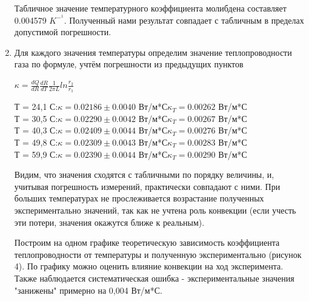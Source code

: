 \documentclass{article}
\begin{document}
\begin{enumerate}
    Табличное значение температурного коэффициента молибдена составляет 0.004579 $K^-^1$. Полученный нами результат совпадает с табличным в пределах допустимой погрешности.
    
    \item Для каждого значения температуры определим значение теплопроводности газа по формуле, учтём погрешности из предыдущих пунктов
    \begin{center}
    $\kappa = \frac{dQ}{dR} \frac{dR}{dT} \frac{1}{2 \pi L} ln\frac{r_2}{r_1}$
    \end{center}
    
    \begin{center}
     Т = 24,1 С:\hspace{0.5cm}$\kappa = 0.02186 \pm 0.0040$ Вт/м*С\hspace{0.5cm}$\kappa_T = 0.00262$ Вт/м*С\\
     Т = 30,5 С:\hspace{0.5cm}$\kappa = 0.02290 \pm 0.0042$ Вт/м*С\hspace{0.5cm}$\kappa_T = 0.00267$ Вт/м*С\\
     Т = 40,3 С:\hspace{0.5cm}$\kappa = 0.02409 \pm 0.0044$ Вт/м*С\hspace{0.5cm}$\kappa_T = 0.00276$ Вт/м*С\\
     Т = 49,8 С:\hspace{0.5cm}$\kappa = 0.02309 \pm 0.0043$ Вт/м*С\hspace{0.5cm}$\kappa_T = 0.00283$ Вт/м*С\\
     Т = 59,9 С:\hspace{0.5cm}$\kappa = 0.02390 \pm 0.0044$ Вт/м*С\hspace{0.5cm}$\kappa_T = 0.00290$ Вт/м*С\\ 
     \end{center}
    
   \par  Видим, что значения сходятся с табличными по порядку величины, и, учитывая погрешность измерений, практически совпадают с ними. При больших температурах не прослеживается возрастание полученных экспериментально значений, так как не учтена роль конвекции (если учесть эти потери, значения окажутся ближе к реальным). \par
   
   Построим на одном графике теоретическую зависимость коэффициента теплопроводности от температуры и полученную экспериментально (рисунок 4). По графику можно оценить влияние конвекции на ход эксперимента. Также наблюдается систематическая ошибка - экспериментальные значения "занижены" примерно на 0,004 Вт/м*С.
   

\end{enumerate}
\end{document}
